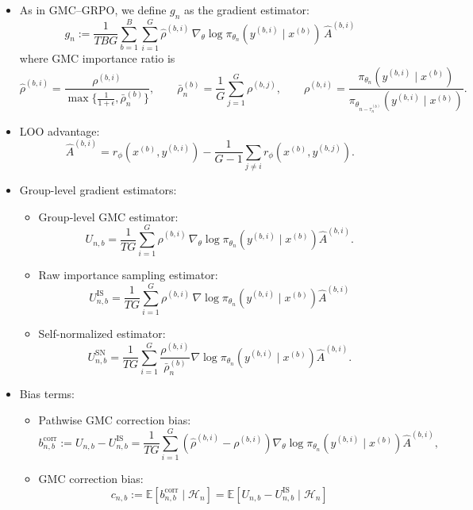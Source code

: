 \documentclass[10pt]{article}
\newcommand{\E}{\mathbb{E}}
\newcommand{\Hh}{\mathcal{H}}
\newcommand{\grad}{\nabla}
\newcommand{\xs}{x^{(b)}}
\newcommand{\ys}{y^{(b,i)}}
\newcommand{\Ab}{\widehat A^{(b,i)}}
\newcommand{\rh}{\widehat\rho^{(b,i)}}
\newcommand{\rb}{\rho^{(b,i)}}
\theoremstyle{preserved}
\begin{document}
\begin{itemize}
    \item As in GMC--GRPO, we define $g_n$ as the gradient estimator:
\begin{equation*}
g_n:=\frac{1}{TBG}\sum_{b=1}^B\sum_{i=1}^G\rh\,\grad_\theta\log\pi_{\theta_n}(\ys\mid\xs)\,\Ab
\end{equation*}
where GMC importance ratio is
\begin{equation*}
\rh=\frac{\rb}{\max\bigl\{\frac{1}{1+\epsilon},\bar\rho_n^{(b)}\bigr\}},\qquad
\bar\rho_n^{(b)}=\frac1G\sum_{j=1}^G\rho^{(b,j)},\qquad
\rb=\frac{\pi_{\theta_n}(\ys\mid\xs)}{\pi_{\theta_{n-\tau_n^{(b)}}}(\ys\mid\xs)}.
\end{equation*}
\item LOO advantage:
\begin{equation*}
\Ab=r_\phi(\xs,\ys)-\frac1{G-1}\sum_{j\ne i}r_\phi(x^{(b)},y^{(b,j)}).
\end{equation*}
\item Group-level gradient estimators:
\begin{itemize}
    \item Group-level GMC estimator:
    \begin{equation*} U_{n,b}=\frac1{TG}\sum_{i=1}^G\rh\,\grad_\theta\log\pi_{\theta_n}(\ys\mid\xs)\Ab.
    \end{equation*}
    \item Raw importance sampling estimator:
    \begin{equation*}  U_{n,b}^{\mathrm{IS}}=\frac1{TG}\sum_{i=1}^G\rb\,\grad\log\pi_{\theta_n}(\ys\mid\xs)\Ab
    \end{equation*}
    \item Self-normalized estimator:
    \begin{equation*} U_{n,b}^{\mathrm{SN}}=\frac1{TG}\sum_{i=1}^G\frac{\rb}{\bar\rho_n^{(b)}}\grad\log\pi_{\theta_n}(\ys\mid\xs)\Ab.
    \end{equation*}
\end{itemize}
\item Bias terms:
\begin{itemize}
    \item Pathwise GMC correction bias: \begin{equation*} b_{n,b}^{\mathrm{corr}}:=U_{n,b}-U^{\mathrm{IS}}_{n,b}=\frac1{TG}\sum_{i=1}^G(\rh-\rb)\grad_\theta\log\pi_{\theta_n}(\ys\mid\xs)\Ab,
    \end{equation*}
    \item GMC correction bias: $$c_{n,b}:=\E[b_{n,b}^{\mathrm{corr}}\mid\Hh_n]=\E[U_{n,b}-U^{\mathrm{IS}}_{n,b}\mid\Hh_n]$$

\end{itemize}
\end{itemize}
\end{document}
